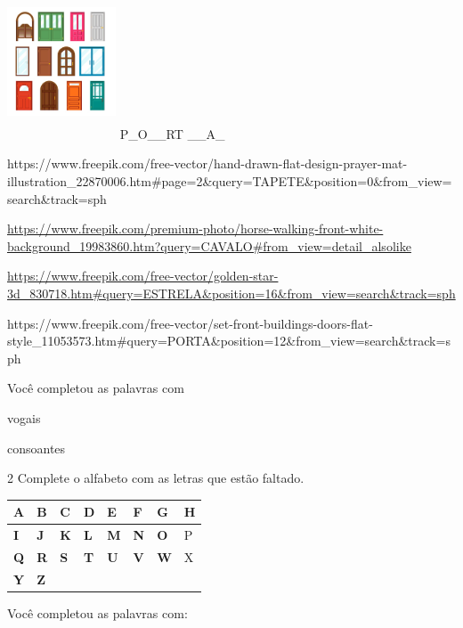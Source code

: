 {\includegraphics[width=1.27083in,height=1.80035in]{media/image4.jpeg}
P\_O\_\_RT \_\_A\_

https://www.freepik.com/free-vector/hand-drawn-flat-design-prayer-mat-illustration\_22870006.htm\#page=2\&query=TAPETE\&position=0\&from\_view=search\&track=sph

\url{https://www.freepik.com/premium-photo/horse-walking-front-white-background_19983860.htm?query=CAVALO\#from_view=detail_alsolike}

\url{https://www.freepik.com/free-vector/golden-star-3d_830718.htm\#query=ESTRELA\&position=16\&from_view=search\&track=sph}

https://www.freepik.com/free-vector/set-front-buildings-doors-flat-style\_11053573.htm\#query=PORTA\&position=12\&from\_view=search\&track=sph

Você completou as palavras com


vogais 

consoantes


\num{2} Complete o alfabeto com as letras que estão faltado.

\begin{longtable}[]{@{}llllllll@{}}
\toprule
\textbf{A } & \textbf{B} & \textbf{C} & \textbf{D} & \textbf{E} &
\textbf{F} & \textbf{G} & H\tabularnewline
\midrule
\endhead
\textbf{I} & \textbf{J} & \textbf{K} & \textbf{L} & \textbf{M} &
\textbf{N} & \textbf{O} & P\tabularnewline
\textbf{Q} & \textbf{R} & \textbf{S} & \textbf{T} & \textbf{U} &
\textbf{V} & \textbf{W} & X\tabularnewline
\textbf{Y} & \textbf{Z}\tabularnewline
\bottomrule
\end{longtable}

Você completou as palavras com:

}

